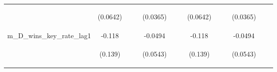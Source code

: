 \documentclass[]{article}
\begin{document}
\begin{center}
\begin{tabular}{lcccccccccccc}
\vspace{4pt} & \begin{footnotesize}(0.0642)\end{footnotesize} & \begin{footnotesize}\end{footnotesize} & \begin{footnotesize}\end{footnotesize} & \begin{footnotesize}(0.0365)\end{footnotesize} & \begin{footnotesize}\end{footnotesize} & \begin{footnotesize}\end{footnotesize} & \begin{footnotesize}(0.0642)\end{footnotesize} & \begin{footnotesize}\end{footnotesize} & \begin{footnotesize}\end{footnotesize} & \begin{footnotesize}(0.0365)\end{footnotesize} & \begin{footnotesize}\end{footnotesize} & \begin{footnotesize}\end{footnotesize} \\
m\_D\_wins\_key\_rate\_lag1 & -0.118 &  &  & -0.0494 &  &  & -0.118 &  &  & -0.0494 &  &  \\
\vspace{4pt} & \begin{footnotesize}(0.139)\end{footnotesize} & \begin{footnotesize}\end{footnotesize} & \begin{footnotesize}\end{footnotesize} & \begin{footnotesize}(0.0543)\end{footnotesize} & \begin{footnotesize}\end{footnotesize} & \begin{footnotesize}\end{footnotesize} & \begin{footnotesize}(0.139)\end{footnotesize} & \begin{footnotesize}\end{footnotesize} & \begin{footnotesize}\end{footnotesize} & \begin{footnotesize}(0.0543)\end{footnotesize} & \begin{footnotesize}\end{footnotesize} & \begin{footnotesize}\end{footnotesize} \\

\end{tabular}
\end{center}
\end{document}
